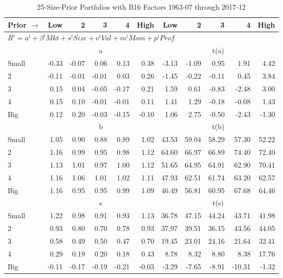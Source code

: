 
\begin{table}[!ht]
\footnotesize
\centering
\caption{25-Size-Prior Portfolios with B16 Factors 1963-07 through 2017-12}
\begin{tabular}{lrrrrrrrrrr}
  \toprule
    
    Prior $\rightarrow$ & Low & 2 & 3 & 4 & High & Low & 2 & 3 & 4 & High  \\ 
  \midrule
  \multicolumn{11}{l}{$R^i=a^i+\beta^iMkt+s^iSize+v^iVal+m^iMom+p^iProf$}  \\
  
     & \multicolumn{5}{c}{a} & \multicolumn{5}{c}{t(a)}   \\
     \cmidrule(r){2-6} \cmidrule(r){7-11} 
    Small  & -0.33  & -0.07  & 0.06  & 0.13  & 0.38  & -3.13  & -1.09  & 0.95  & 1.91  & 4.42   \\
    2  & -0.11  & -0.01  & -0.01  & 0.03  & 0.26  & -1.45  & -0.22  & -0.11  & 0.45  & 3.84   \\
    3  & 0.15  & 0.04  & -0.05  & -0.17  & 0.21  & 1.59  & 0.61  & -0.83  & -2.48  & 3.00   \\
    4  & 0.15  & 0.10  & -0.01  & -0.01  & 0.11  & 1.41  & 1.29  & -0.18  & -0.08  & 1.43   \\
    Big  & 0.12  & 0.20  & -0.03  & -0.15  & -0.10  & 1.06  & 2.75  & -0.50  & -2.43  & -1.30   \\
    
  
     & \multicolumn{5}{c}{b} & \multicolumn{5}{c}{t(b)}   \\
     \cmidrule(r){2-6} \cmidrule(r){7-11} 
    Small  & 1.05  & 0.90  & 0.88  & 0.89  & 1.02  & 43.53  & 59.04  & 58.29  & 57.30  & 52.22   \\
    2  & 1.16  & 0.99  & 0.95  & 0.98  & 1.12  & 64.60  & 66.97  & 66.89  & 74.40  & 72.40   \\
    3  & 1.13  & 1.01  & 0.97  & 1.00  & 1.12  & 51.65  & 64.95  & 64.91  & 62.90  & 70.41   \\
    4  & 1.16  & 1.06  & 1.01  & 1.02  & 1.11  & 47.93  & 62.51  & 61.74  & 63.20  & 62.57   \\
    Big  & 1.16  & 0.95  & 0.95  & 0.99  & 1.09  & 46.49  & 56.81  & 60.95  & 67.68  & 64.46   \\
    
  
     & \multicolumn{5}{c}{s} & \multicolumn{5}{c}{t(s)}   \\
     \cmidrule(r){2-6} \cmidrule(r){7-11} 
    Small  & 1.22  & 0.98  & 0.91  & 0.93  & 1.13  & 36.78  & 47.15  & 44.24  & 43.71  & 41.98   \\
    2  & 0.93  & 0.80  & 0.70  & 0.78  & 0.93  & 37.97  & 39.51  & 36.15  & 43.56  & 44.05   \\
    3  & 0.58  & 0.49  & 0.50  & 0.47  & 0.70  & 19.45  & 23.01  & 24.16  & 21.64  & 32.41   \\
    4  & 0.29  & 0.19  & 0.20  & 0.18  & 0.43  & 8.78  & 8.32  & 8.80  & 8.38  & 17.76   \\
    Big  & -0.11  & -0.17  & -0.19  & -0.21  & -0.03  & -3.29  & -7.65  & -8.91  & -10.31  & -1.32   \\
    

\end{tabular}
\end{table}
